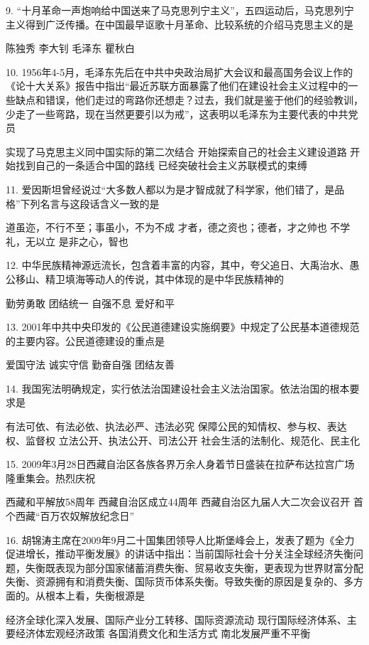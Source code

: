 9. “十月革命一声炮响给中国送来了马克思列宁主义”，五四运动后，马克思列宁主义得到广泛传播。在中国最早讴歌十月革命、比较系统的介绍马克思主义的是
\begin{choices}
	 陈独秀
	 李大钊
	 毛泽东
	 瞿秋白
\end{choices}
10. 1956年4-5月，毛泽东先后在中共中央政治局扩大会议和最高国务会议上作的《论十大关系》报告中指出“最近苏联方面暴露了他们在建设社会主义过程中的一些缺点和错误，他们走过的弯路你还想走？过去，我们就是鉴于他们的经验教训，少走了一些弯路，现在当然更要引以为戒”，这表明以毛泽东为主要代表的中共党员
\begin{choices}
	 实现了马克思主义同中国实际的第二次结合
	 开始探索自己的社会主义建设道路
	 开始找到自己的一条适合中国的路线
	 已经突破社会主义苏联模式的束缚
\end{choices}
11. 爱因斯坦曾经说过“大多数人都以为是才智成就了科学家，他们错了，是品格”下列名言与这段话含义一致的是
\begin{choices}
	 道虽迩，不行不至；事虽小，不为不成
	 才者，德之资也；德者，才之帅也
	 不学礼，无以立
	 是非之心，智也
\end{choices}
12. 中华民族精神源远流长，包含着丰富的内容，其中，夸父追日、大禹治水、愚公移山、精卫填海等动人的传说，其中体现的是中华民族精神的
\begin{choices}
	 勤劳勇敢
	 团结统一
	 自强不息
	 爱好和平
\end{choices}
13. 2001年中共中央印发的《公民道德建设实施纲要》中规定了公民基本道德规范的主要内容。公民道德建设的重点是
\begin{choices}
	 爱国守法
	 诚实守信
	 勤奋自强
	 团结友善
\end{choices}
14. 我国宪法明确规定，实行依法治国建设社会主义法治国家。依法治国的根本要求是
\begin{choices}
	 有法可依、有法必依、执法必严、违法必究
	 保障公民的知情权、参与权、表达权、监督权
	 立法公开、执法公开、司法公开
	 社会生活的法制化、规范化、民主化
\end{choices}
15. 2009年3月28日西藏自治区各族各界万余人身着节日盛装在拉萨布达拉宫广场隆重集会。热烈庆祝
\begin{choices}
	 西藏和平解放58周年
	 西藏自治区成立44周年
	 西藏自治区九届人大二次会议召开
	 首个西藏“百万农奴解放纪念日”
\end{choices}
16. 胡锦涛主席在2009年9月二十国集团领导人比斯堡峰会上，发表了题为《全力促进增长，推动平衡发展》的讲话中指出：当前国际社会十分关注全球经济失衡问题，失衡既表现为部分国家储蓄消费失衡、贸易收支失衡，更表现为世界财富分配失衡、资源拥有和消费失衡、国际货币体系失衡。导致失衡的原因是复杂的、多方面的。从根本上看，失衡根源是
\begin{choices}
	 经济全球化深入发展、国际产业分工转移、国际资源流动
	 现行国际经济体系、主要经济体宏观经济政策
	 各国消费文化和生活方式
	 南北发展严重不平衡
\end{choices}
\vspace{6pt}
